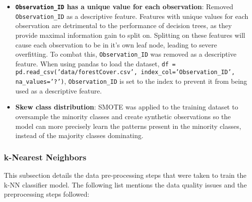\documentclass[conference]{IEEEtran}
\begin{document}
\begin{itemize}
    \item \textbf{\texttt{Observation\_ID} has a unique value for each observation}: Removed \texttt{Observation\_ID} as a descriptive feature. Features with unique values for each observation are detrimental to the performance of decision trees, as they provide maximal information gain to split on. Splitting on these features will cause each observation to be in it's own leaf node, leading to severe overfitting. To combat this, \texttt{Observation\_ID} was removed as a descriptive feature. When using pandas to load the dataset, \texttt{df = pd.read\_csv('data/forestCover.csv', index\_col='Observation\_ID', na\_values='?')}, \texttt{Observation\_ID} is set to the index to prevent it from being used as a descriptive feature.
    \item \textbf{Skew class distribution}: SMOTE was applied to the training dataset to oversample the minority classes and create synthetic observations so the model can more precisely learn the patterns present in the minority classes, instead of the majority classes dominating. 
\end{itemize}

\subsubsection{\textbf{k-Nearest Neighbors}}

This subsection details the data pre-processing steps that were taken to train the k-NN classifier model. The following list mentions the data quality issues and the preprocessing steps followed:
\end{document}
